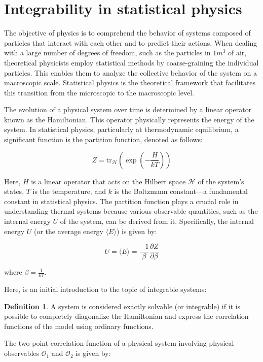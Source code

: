 \documentclass[11pt]{article}
\theoremstyle{definition}
\newtheorem{Def}{Definition}[section]
\begin{document}
\section{\Large \textbf{Integrability in statistical physics}}
The objective of physics is to comprehend the behavior of systems composed of particles that interact with each other and to predict their actions. When dealing with a large number of degrees of freedom, such as the particles in $1 m^3$ of air, theoretical physicists employ statistical methods by coarse-graining the individual particles. This enables them to analyze the collective behavior of the system on a macroscopic scale. Statistical physics is the theoretical framework that facilitates this transition from the microscopic to the macroscopic level.\vspace{0.2cm} 

The evolution of a physical system over time is determined by a linear operator known as the Hamiltonian. This operator physically represents the energy of the system. In statistical physics, particularly at thermodynamic equilibrium, a significant function is the partition function, denoted as follows:

\[ Z = \text{tr}_{\mathcal{H}}\left(\exp\left(-\frac{H}{kT}\right)\right) \]

Here, \( H \) is a linear operator that acts on the Hilbert space \( \mathcal{H} \) of the system's states, \( T \) is the temperature, and \( k \) is the Boltzmann constant—a fundamental constant in statistical physics. The partition function plays a crucial role in understanding thermal systems because various observable quantities, such as the internal energy \( U \) of the system, can be derived from it. Specifically, the internal energy \( U \) (or the average energy \( \langle E \rangle \)) is given by:

\[ U = \langle E \rangle = \frac{-1}{\beta}\frac{\partial Z}{\partial\beta} \]

where \( \beta = \frac{1}{kT} \).

Here, is an initial introduction to the topic of integrable systems:

\begin{Def} 
A system is considered exactly solvable (or integrable) if it is possible to completely diagonalize the Hamiltonian and express the correlation functions of the model using ordinary functions.
\end{Def}

The two-point correlation function of a physical system involving physical observables $\mathcal{O}_1$ and $\mathcal{O}_2$ is given by:
\end{document}

